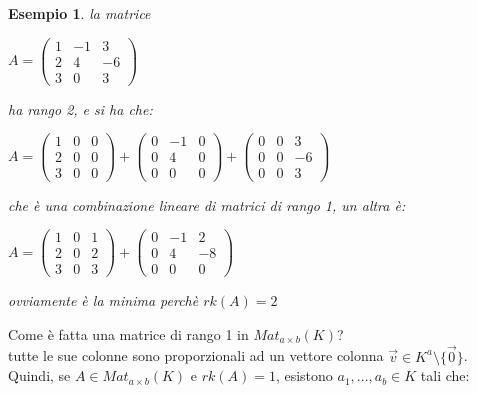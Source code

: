 \documentclass[a4paper,12pt]{article}
\theoremstyle{def}
\theoremstyle{prop}
\theoremstyle{esempio}
\newtheorem*{example}{Esempio}
\theoremstyle{dimostrazione}
\theoremstyle{teo}
\theoremstyle{osservazione}
\begin{document}
\begin{example}
	la matrice
	\begin{center}
		\(A = \begin{pmatrix}
			1 & -1 & 3  \\
			2 & 4  & -6 \\
			3 & 0  & 3
		\end{pmatrix}\)
	\end{center}
	ha rango 2, e si ha che:
	\begin{center}
		\(A = \begin{pmatrix}
			1 & 0 & 0  \\
			2 & 0 & 0  \\
			3 & 0 & 0
		\end{pmatrix} + \begin{pmatrix}
			0 & -1 & 0  \\
			0 & 4  & 0  \\
			0 & 0  & 0
		\end{pmatrix} + \begin{pmatrix}
			0 & 0 & 3  \\
			0 & 0 & -6 \\
			0 & 0 & 3
		\end{pmatrix}\)
	\end{center}
	che è una combinazione lineare di matrici di rango 1, un altra è:
	\begin{center}
		\(A = \begin{pmatrix}
			1 & 0 & 1  \\
			2 & 0 & 2  \\
			3 & 0 & 3
		\end{pmatrix} + \begin{pmatrix}
			0 & -1 & 2  \\
			0 & 4  & -8 \\
			0 & 0  & 0
		\end{pmatrix}\)
	\end{center}
	ovviamente è la minima perchè \(rk(A) = 2\)\\
\end{example}
Come è fatta una matrice di rango 1 in \(Mat_{a \times b}(K)\)?\\
tutte le sue colonne sono proporzionali ad un vettore colonna \(\overrightarrow{v} \in K^a \setminus \{\overrightarrow{0}\}\).\\
Quindi, se \(A \in Mat_{a \times b}(K)\) e \(rk(A) = 1\), esistono \(a_1, ..., a_b \in K\) tali che:
\end{document}
